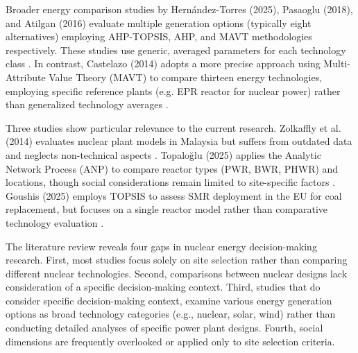 Broader energy comparison studies by Hernández-Torres (2025), Pasaoglu (2018), and Atilgan (2016) evaluate multiple generation options (typically eight alternatives) employing AHP-TOPSIS, AHP, and MAVT methodologies respectively. These studies use generic, averaged parameters for each technology class \cite{HERNANDEZTORRES2025122481,PASAOGLU2018654,ATILGAN2016168}. In contrast, Castelazo (2014) adopts a more precise approach using Multi-Attribute Value Theory (MAVT) to compare thirteen energy technologies, employing specific reference plants (e.g. EPR reactor for nuclear power) rather than generalized technology averages \cite{SANTOYOCASTELAZO2014119}.

Three studies show particular relevance to the current research. Zolkaffly et al. (2014) evaluates nuclear plant models in Malaysia but suffers from outdated data and neglects non-technical aspects \cite{10.1063/1.4866099}. Topaloğlu (2025) applies the Analytic Network Process (ANP) to compare reactor types (PWR, BWR, PHWR) and locations, though social considerations remain limited to site-specific factors \cite{TOPALOGLU2025103228}. Goushis (2025) employs TOPSIS to assess SMR deployment in the EU for coal replacement, but focuses on a single reactor model rather than comparative technology evaluation \cite{GOUSHIS2025126565}.

The literature review reveals four gaps in nuclear energy decision-making research. First, most studies focus solely on site selection rather than comparing different nuclear technologies. Second, comparisons between nuclear designs lack consideration of a specific decision-making context. Third, studies that do consider specific decision-making context, examine various energy generation options as broad technology categories (e.g., nuclear, solar, wind) rather than conducting detailed analyses of specific power plant designs. Fourth, social dimensions are frequently overlooked or applied only to site selection criteria.

